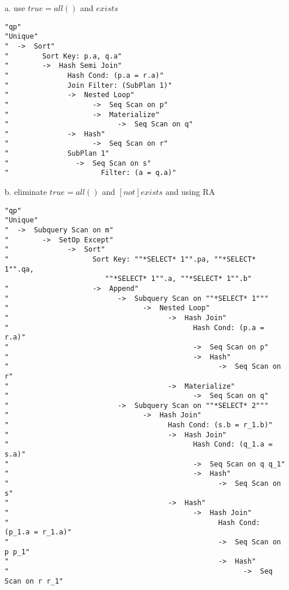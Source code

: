 \documentclass[10pt]{article}
\begin{document}
\begin{itemize}
\item[a.] use $true = all()$ and $exists$\\



\begin{lstlisting}
"qp"
"Unique"
"  ->  Sort"
"        Sort Key: p.a, q.a"
"        ->  Hash Semi Join"
"              Hash Cond: (p.a = r.a)"
"              Join Filter: (SubPlan 1)"
"              ->  Nested Loop"
"                    ->  Seq Scan on p"
"                    ->  Materialize"
"                          ->  Seq Scan on q"
"              ->  Hash"
"                    ->  Seq Scan on r"
"              SubPlan 1"
"                ->  Seq Scan on s"
"                      Filter: (a = q.a)"
\end{lstlisting}


\newpage
\item[b.] eliminate $true = all()$ and $ [not] exists $ and using RA \\
\begin{lstlisting}
"qp"
"Unique"
"  ->  Subquery Scan on m"
"        ->  SetOp Except"
"              ->  Sort"
"                    Sort Key: ""*SELECT* 1"".pa, ""*SELECT* 1"".qa, 
                        ""*SELECT* 1"".a, ""*SELECT* 1"".b"
"                    ->  Append"
"                          ->  Subquery Scan on ""*SELECT* 1"""
"                                ->  Nested Loop"
"                                      ->  Hash Join"
"                                            Hash Cond: (p.a = r.a)"
"                                            ->  Seq Scan on p"
"                                            ->  Hash"
"                                                  ->  Seq Scan on r"
"                                      ->  Materialize"
"                                            ->  Seq Scan on q"
"                          ->  Subquery Scan on ""*SELECT* 2"""
"                                ->  Hash Join"
"                                      Hash Cond: (s.b = r_1.b)"
"                                      ->  Hash Join"
"                                            Hash Cond: (q_1.a = s.a)"
"                                            ->  Seq Scan on q q_1"
"                                            ->  Hash"
"                                                  ->  Seq Scan on s"
"                                      ->  Hash"
"                                            ->  Hash Join"
"                                                  Hash Cond: (p_1.a = r_1.a)"
"                                                  ->  Seq Scan on p p_1"
"                                                  ->  Hash"
"                                                        ->  Seq Scan on r r_1"
\end{lstlisting}


\end{itemize}
\end{document}
